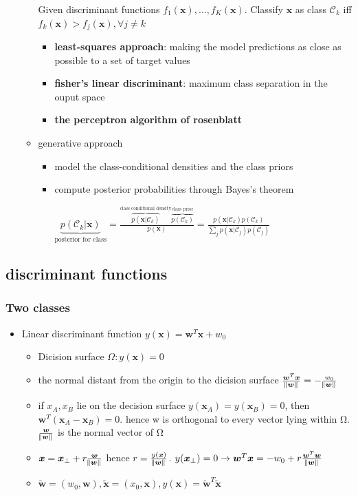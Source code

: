 \documentclass[11pt]{article}
\newcommand{\bl}[1] {\boldsymbol{#1}}
\begin{document}
\begin{itemize}
\begin{itemize}
Given discriminant functions \(f_1(\bl{x}),\dots,f_K(\bl{x})\). Classify
\(\bl{x}\) as class \(\mathcal{C}_k\) iff \(f_k(\bl{x})>f_j(\bl{x}),\forall
       j\neq k\)

\begin{itemize}
\item \textbf{least-squares approach}: making the model predictions as close as
possible to a set of target values
\item \textbf{fisher's linear discriminant}: maximum class separation in the ouput
space
\item \textbf{the perceptron algorithm of rosenblatt}
\end{itemize}
\item generative approach
\begin{itemize}
\item model the class-conditional densities and the class priors
\item compute posterior probabilities through Bayes's theorem

\(\underbrace{p(\mathcal{C}_k|\bl{x})}_\text{posterior for class}=
         \frac{\overbrace{p(\bl{x}|\mathcal{C}_k)}^\text{class conditional density}
         \overbrace{p(\mathcal{C}_k)}^\text{class prior}}{p(\bl{x})}=
         \frac{p(\bl{x}|\mathcal{C}_k)p(\mathcal{C}_k)}{\sum_{j}p(\bl{x}|\mathcal{C}_j)
         p(\mathcal{C}_j)}\)
\end{itemize}
\end{itemize}
\end{itemize}
\subsection{discriminant functions}
\label{sec:org4fa00aa}
\subsubsection{Two classes}
\label{sec:org0e90dbf}
\begin{itemize}
\item Linear discriminant function \(y(\bl{x})=\bl{w}^T\bl{x}+w_0\)
\begin{itemize}
\item Dicision surface \(\Omega:y(\bl{x})=0\)
\item the normal distant from the origin to the dicision surface
\(\frac{\bl{w}^T\bl{x}}{\norm{\bl{w}}}=-\frac{w_0}{\norm{\bl{w}}}\)
\item if \(x_A,x_B\) lie on the decision surface \(y(\bl{x}_A)=y(\bl{x}_B)=0\),
then \(\bl{w}^T(\bl{x}_A-\bl{x}_B)=0\). hence w is orthogonal to every
vector lying within Ω. \(\frac{\bl{w}}{\norm{\bl{w}}}\) is the normal
vector of Ω

\item \(\bl{x}=\bl{x}_\perp+r\frac{\bl{w}}{\norm{\bl{w}}}\) hence
\(r=\frac{y(\bl{x})}{\norm{\bl{w}}}\). \(y(\bl{x}_\perp)=0\to
        \bl{w}^T\bl{x}=-w_0+r\frac{\bl{w}^T\bl{w}}{\norm{\bl{w}}}\)
\item \(\tilde{\bl{w}}=(w_0,\bl{w}), \tilde{\bl{x}}=(x_0,\bl{x}),
        y(\bl{x})=\tilde{\bl{w}}^T\tilde{\bl{x}}\)
\end{itemize}
\end{itemize}
\end{document}

